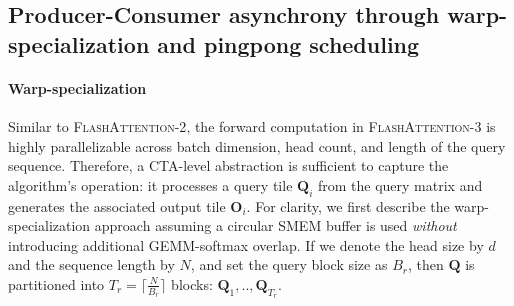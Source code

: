 \subsection{Producer-Consumer asynchrony through warp-specialization and pingpong scheduling}
\label{sec:algo_ws}

\paragraph{Warp-specialization}
Similar to \textsc{FlashAttention-2}, the forward computation in \textsc{FlashAttention-3} is highly parallelizable across batch dimension, head count, and length of the query sequence. Therefore, a CTA-level abstraction is sufficient to capture the algorithm’s operation: it processes a query tile $\mathbf{Q}_i$ from the query matrix and generates the associated output tile $\mathbf{O}_i$. For clarity, we first describe the warp-specialization approach assuming a circular SMEM buffer is used \emph{without} introducing additional GEMM-softmax overlap. If we denote the head size by $d$ and the sequence length by $N$, and set the query block size as $B_r$, then $\mathbf{Q}$ is partitioned into $T_r = \lceil \frac{N}{B_r} \rceil$ blocks: $\mathbf{Q}_1, .., \mathbf{Q}_{T_r}$.

